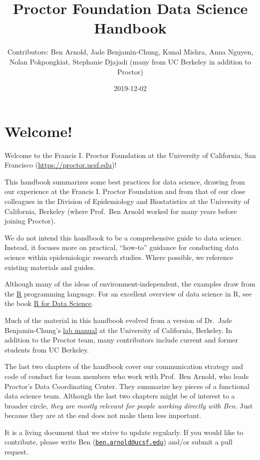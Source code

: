 \documentclass[]{book}
\title{Proctor Foundation Data Science Handbook}
\author{Contributors: Ben Arnold, Jade Benjamin-Chung, Kunal Mishra, Anna Nguyen, Nolan Pokpongkiat, Stephanie Djajadi (many from UC Berkeley in addition to Proctor)}
\date{2019-12-02}
\begin{document}
\maketitle

{
\setcounter{tocdepth}{1}
\tableofcontents
}
\hypertarget{welcome}{%
\chapter*{Welcome!}\label{welcome}}

Welcome to the Francis I. Proctor Foundation at the University of California, San Francisco (\url{https://proctor.ucsf.edu})!

This handbook summarizes some best practices for data science, drawing from our experience at the Francis I. Proctor Foundation and from that of our close colleagues in the Division of Epidemiology and Biostatistics at the University of California, Berkeley (where Prof.~Ben Arnold worked for many years before joining Proctor).

We do not intend this handbook to be a comprehensive guide to data science. Instead, it focuses more on practical, ``how-to'' guidance for conducting data science within epidemiologic research studies. Where possible, we reference existing materials and guides.

Although many of the ideas of environment-independent, the examples draw from the \href{https://cran.r-project.org/}{R} programming language. For an excellent overview of data science in R, see the book \href{https://r4ds.had.co.nz/}{R for Data Science}.

Much of the material in this handbook evolved from a version of Dr.~Jade Benjamin-Chung's \href{https://github.com/jadebc-berkeley/lab-manual}{lab manual} at the University of California, Berkeley. In addition to the Proctor team, many contributors include current and former students from UC Berkeley.

The last two chapters of the handbook cover our communication strategy and code of conduct for team members who work with Prof.~Ben Arnold, who leads Proctor's Data Coordinating Center. They summarize key pieces of a functional data science team. Although the last two chapters might be of interest to a broader circle, \emph{they are mostly relevant for people working directly with Ben.} Just because they are at the end does not make them less important.

It is a living document that we strive to update regularly. If you would like to contribute, please write Ben (\href{mailto:ben.arnold@ucsf.edu}{\nolinkurl{ben.arnold@ucsf.edu}}) and/or submit a pull request.
\end{document}
